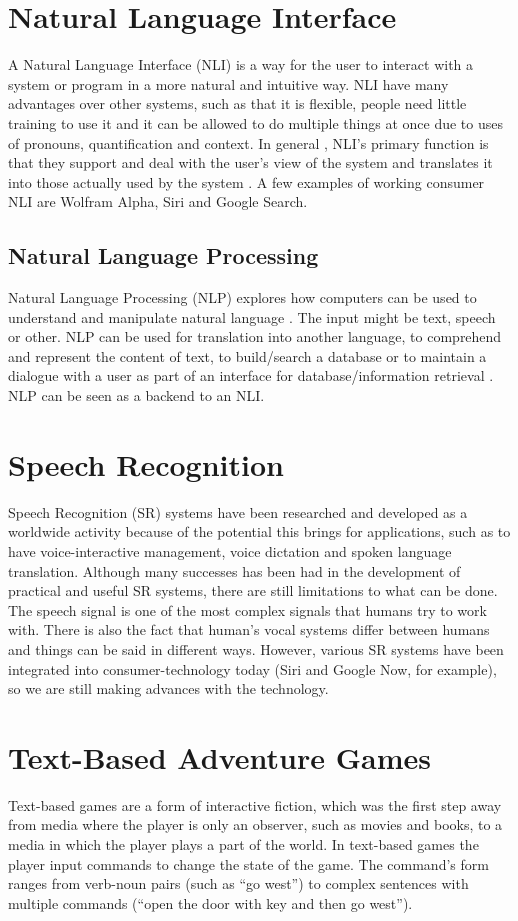 \section{Natural Language Interface}
A Natural Language Interface (NLI) is a way for the user to interact with a system or program in a more natural and intuitive way. NLI have many advantages over other systems, such as that it is flexible, people need little training to use it and it can be allowed to do multiple things at once due to uses of pronouns, quantification and context. In general , NLI’s primary function is that they support and deal with the user’s view of the system and translates it into those actually used by the system \citep{Hend}. A few examples of working consumer NLI are Wolfram Alpha, Siri and Google Search.

\subsection{Natural Language Processing}
Natural Language Processing (NLP) explores how computers can be used to understand and manipulate natural language \citep{Gobi}. The input might be text, speech or other. NLP can be used for translation into another language, to comprehend and represent the content of text, to build/search a database or to maintain a dialogue with a user as part of an interface for database/information retrieval \citep{Allen}. NLP can be seen as a backend to an NLI.

\section{Speech Recognition}
Speech Recognition (SR) systems have been researched and developed as a worldwide activity because of the potential this brings for applications, such as to have voice-interactive management, voice dictation and spoken language translation. Although many successes has been had in the development of practical and useful SR systems, there are still limitations to what can be done. The speech signal is one of the most complex signals that humans try to work with. There is also the fact that human’s vocal systems differ between humans and things can be said in different ways. However, various SR systems have been integrated into consumer-technology today (Siri and Google Now, for example), so we are still making advances with the technology. \citep{SR}

\section{Text-Based Adventure Games}
Text-based games are a form of interactive fiction, which was the first step away from media where the player is only an observer, such as movies and books, to a media in which the player plays a part of the world. In text-based games the player input commands to change the state of the game. The command's form ranges from verb-noun pairs (such as ``go west'') to complex sentences with multiple commands (``open the door with key and then go west'').\citep[page 54-55]{Sweet}

